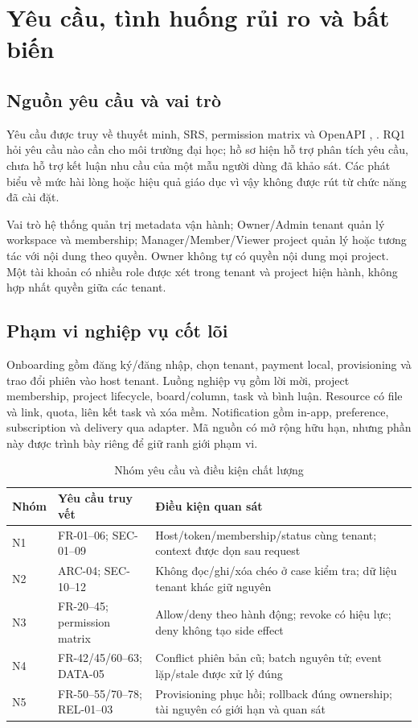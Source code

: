 \section{Yêu cầu, tình huống rủi ro và bất biến}\label{sec:requirements}
\subsection{Nguồn yêu cầu và vai trò}
Yêu cầu được truy về thuyết minh, SRS, permission matrix và OpenAPI , . RQ1 hỏi yêu cầu nào cần cho môi trường đại học; hồ sơ hiện hỗ trợ phân tích yêu cầu, chưa hỗ trợ kết luận nhu cầu của một mẫu người dùng đã khảo sát. Các phát biểu về mức hài lòng hoặc hiệu quả giáo dục vì vậy không được rút từ chức năng đã cài đặt.

Vai trò hệ thống quản trị metadata vận hành; Owner\slash Admin tenant quản lý workspace và membership; Manager\slash Member\slash Viewer project quản lý hoặc tương tác với nội dung theo quyền. Owner không tự có quyền nội dung mọi project. Một tài khoản có nhiều role được xét trong tenant và project hiện hành, không hợp nhất quyền giữa các tenant.

\subsection{Phạm vi nghiệp vụ cốt lõi}
Onboarding gồm đăng ký\slash đăng nhập, chọn tenant, payment local, provisioning và trao đổi phiên vào host tenant. Luồng nghiệp vụ gồm lời mời, project membership, project lifecycle, board\slash column, task và bình luận. Resource có file và link, quota, liên kết task và xóa mềm. Notification gồm in-app, preference, subscription và delivery qua adapter. Mã nguồn có mở rộng hữu hạn, nhưng phần này được trình bày riêng để giữ ranh giới phạm vi.

\begin{table}[htbp]
\centering\caption{Nhóm yêu cầu và điều kiện chất lượng}\label{tab:requirements}
\begin{tabularx}{\textwidth}{P{.15\textwidth}P{.25\textwidth}X}
\toprule Nhóm & Yêu cầu truy vết & Điều kiện quan sát \\
\midrule
N1 & FR-01--06; SEC-01--09 & Host\slash token\slash membership\slash status cùng tenant; context được dọn sau request \\
N2 & ARC-04; SEC-10--12 & Không đọc\slash ghi\slash xóa chéo ở case kiểm tra; dữ liệu tenant khác giữ nguyên \\
N3 & FR-20--45; permission matrix & Allow\slash deny theo hành động; revoke có hiệu lực; deny không tạo side effect \\
N4 & FR-42\slash 45\slash 60--63; DATA-05 & Conflict phiên bản cũ; batch nguyên tử; event lặp\slash stale được xử lý đúng \\
N5 & FR-50--55\slash 70--78; REL-01--03 & Provisioning phục hồi; rollback đúng ownership; tài nguyên có giới hạn và quan sát \\
\bottomrule\end{tabularx}
\end{table}

